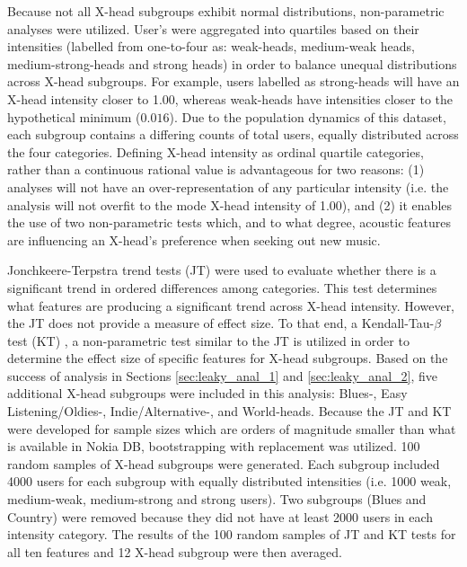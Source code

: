 \documentclass[a4paper]{article}
\begin{document}
Because not all X-head subgroups exhibit normal distributions, non-parametric analyses were utilized. User's were aggregated into quartiles based on their intensities (labelled from one-to-four as: weak-heads, medium-weak heads, medium-strong-heads and strong heads) in order to balance unequal distributions across X-head subgroups. For example, users labelled as strong-heads will have an X-head intensity closer to 1.00, whereas weak-heads have intensities closer to the hypothetical minimum ($0.016$). Due to the population dynamics of this dataset, each subgroup contains a differing counts of total users, equally distributed across the four categories. Defining X-head intensity as ordinal quartile categories, rather than a continuous rational value is advantageous for two reasons: (1) analyses will not have an over-representation of any particular intensity (i.e. the analysis will not overfit to the mode X-head intensity of 1.00), and (2) it enables the use of two non-parametric tests which, and to what degree, acoustic features are influencing an X-head's preference when seeking out new music.

Jonchkeere-Terpstra trend tests (JT) \cite{cuzick1985wilcoxon} were used to evaluate whether there is a significant trend in ordered differences among categories. This test determines what features are producing a significant trend across X-head intensity. However, the JT does not provide a measure of effect size. To that end, a Kendall-Tau-$\beta$ test (KT) \cite{kendall1938new}, a non-parametric test similar to the JT is utilized in order to determine the effect size of specific features for X-head subgroups. Based on the success of analysis in Sections \ref{sec:leaky_anal_1} and \ref{sec:leaky_anal_2}, five additional X-head subgroups were included in this analysis: Blues-, Easy Listening/Oldies-, Indie/Alternative-, and World-heads. Because the JT and KT were developed for sample sizes which are orders of magnitude smaller than what is available in Nokia DB, bootstrapping with replacement was utilized. 100 random samples of X-head subgroups were generated. Each subgroup included 4000 users for each subgroup with equally distributed intensities (i.e. 1000 weak, medium-weak, medium-strong and strong users). Two subgroups (Blues and Country) were removed because they did not have at least 2000 users in each intensity category. The results of the 100 random samples of JT and KT tests for all ten features and 12 X-head subgroup were then averaged.
\end{document}

